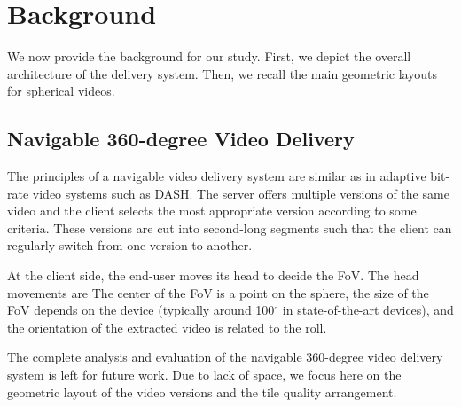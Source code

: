\section{Background}

We now provide the background for our study.
First, we depict the overall architecture of the delivery system.
Then, we recall the main geometric layouts for spherical videos.

\subsection{Navigable 360-degree Video Delivery}

The principles of a navigable video delivery system are similar as in
adaptive bit-rate video systems such as \ac{DASH}. The server offers
multiple versions of the same video and the client selects the most
appropriate version according to some criteria. These versions are cut
into second-long segments such that the client can regularly switch
from one version to another. 

At the client side, the end-user moves its head to decide the
\ac{FoV}. The head movements are  The center of the \ac{FoV} is a
point on the sphere, the size of the \ac{FoV} depends on the device
(typically around 100$^\circ$ in state-of-the-art devices), and the
orientation of the extracted video is related to the roll.

The complete analysis and evaluation of the navigable 360-degree video
delivery system is left for future work. Due to lack of space, we
focus here on the geometric layout of the video versions and the tile
quality arrangement.



